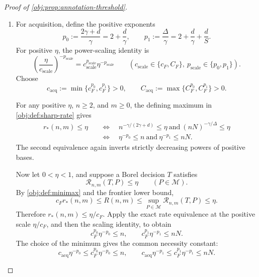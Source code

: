 \begin{proof}[Proof of \cref{obj:prop:annotation-threshold}]
\begin{enumerate}
The remaining sample sizes are \(n=0\) and \(n=1\). At \(n=1\), all power bases equal one, so both the benchmark and \(r_*(1,0)\) equal one. At zero, the numerical formulas use the convention
\[
0^{t_{\mathrm{pow}}}=0
\qquad
\bigl(t_{\mathrm{pow}}\in\mathbb R\setminus\{0\}\bigr).
\]
All exponents occurring here are strictly negative:
\[
-\frac{\gamma}{2\gamma+d}<0,
\qquad
-\frac{\gamma}{\Delta}<0,
\qquad
-\frac{2\gamma}{\Delta}<0.
\]
Thus both branches of the benchmark equal zero at \(n=0\), and the two terms in the maximum defining \(r_*(0,0)\) also equal zero. This proves the benchmark equality for every \(n\in\mathbb N\), with the stated formulas for \(n\ge1\).

\item
For acquisition, define the positive exponents
\[
p_0:=\frac{2\gamma+d}{\gamma}
=2+\frac d\gamma,
\qquad
p_1:=\frac{\Delta}{\gamma}
=2+\frac d\gamma+\frac dS.
\]
For positive \(\eta\), the power-scaling identity is
\[
\left(\frac{\eta}{c_{\mathrm{scale}}}\right)^{-p_{\mathrm{scale}}}
=
c_{\mathrm{scale}}^{p_{\mathrm{scale}}}
\eta^{-p_{\mathrm{scale}}}
\qquad
\left(
c_{\mathrm{scale}}\in\{c_F,C_F\},\
p_{\mathrm{scale}}\in\{p_0,p_1\}
\right).
\]
Choose
\[
c_{\mathrm{acq}}
:=\min\{c_F^{p_0},c_F^{p_1}\}>0,
\qquad
C_{\mathrm{acq}}
:=\max\{C_F^{p_0},C_F^{p_1}\}>0.
\]

For any positive \(\eta\), \(n\ge2\), and \(m\ge0\), the defining maximum in
\cref{obj:def:sharp-rate} gives
\[
\begin{aligned}
r_*(n,m)\le\eta
&\quad\Longleftrightarrow\quad
n^{-\gamma/(2\gamma+d)}\le\eta
\ \text{and}\
(nN)^{-\gamma/\Delta}\le\eta\\
&\quad\Longleftrightarrow\quad
\eta^{-p_0}\le n
\ \text{and}\
\eta^{-p_1}\le nN.
\end{aligned}
\]
The second equivalence again inverts strictly decreasing powers of positive bases.

Now let \(0<\eta<1\), and suppose a Borel decision \(T\) satisfies
\[
\mathcal R_{n,m}(T,P)\le\eta
\qquad(P\in\mathcal M).
\]
By \cref{obj:def:minimax} and the frontier lower bound,
\[
c_F r_*(n,m)\le R(n,m)
\le\sup_{P\in\mathcal M}\mathcal R_{n,m}(T,P)
\le\eta.
\]
Therefore \(r_*(n,m)\le\eta/c_F\). Apply the exact rate equivalence at the positive scale \(\eta/c_F\), and then the scaling identity, to obtain
\[
c_F^{p_0}\eta^{-p_0}\le n,
\qquad
c_F^{p_1}\eta^{-p_1}\le nN.
\]
The choice of the minimum gives the common necessity constant:
\[
c_{\mathrm{acq}}\eta^{-p_0}
\le c_F^{p_0}\eta^{-p_0}\le n,
\qquad
c_{\mathrm{acq}}\eta^{-p_1}
\le c_F^{p_1}\eta^{-p_1}\le nN.
\]


\end{enumerate}
\end{proof}
